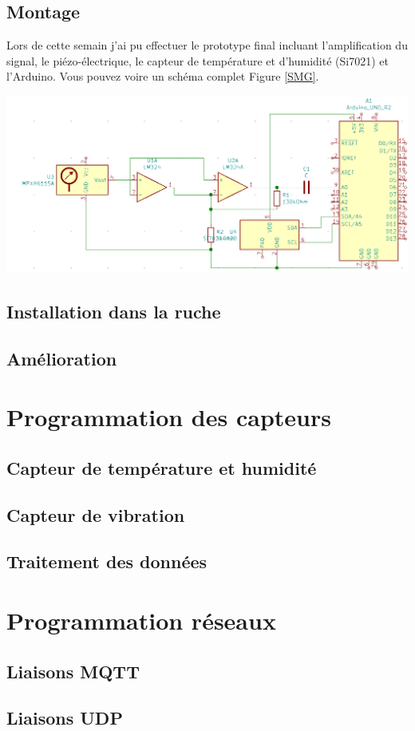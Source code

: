 \documentclass[11pt,french,a4paper]{article}
\begin{document}
\subsection{Montage}
Lors de cette semain j'ai pu effectuer le prototype final incluant l'amplification du signal, le piézo-électrique, le capteur de température et d'humidité (Si7021) et l'Arduino. Vous pouvez voire un schéma complet Figure \ref{SMG}.
\begin{center}
    \includegraphics[scale=0.5]{../img/SMG.png}
    \label{SMG}
\end{center}



\subsection{Installation dans la ruche}
\subsection{Amélioration}
\section{Programmation des capteurs}
\subsection{Capteur de température et humidité}
\subsection{Capteur de vibration}
\subsection{Traitement des données}

\section{Programmation réseaux}
\subsection{Liaisons MQTT}
\subsection{Liaisons UDP}

\newpage
\listoffigures
\end{document}
